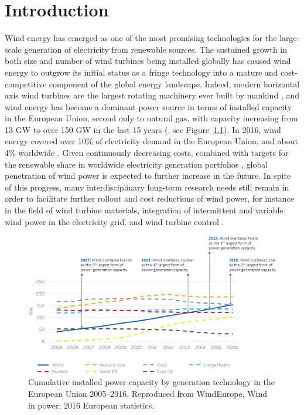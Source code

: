 \chapter{Introduction}\label{ch:introduction}

Wind energy has emerged as one of the most promising technologies for the large-scale generation of electricity from renewable sources. The sustained growth in both size and number of wind turbines being installed globally has caused wind energy to outgrow its initial status as a fringe technology into a mature and cost-competitive component of the global energy landscape. Indeed, modern horizontal axis wind turbines are the largest rotating machinery ever built by mankind \citep{van2016long}, and wind energy has become a dominant power source in terms of installed capacity in the European Union, second only to natural gas, with capacity increasing from 13 GW to over 150 GW in the last 15 years (\citealp{windeurope}, see Figure~\ref{fig:windeurope}). In 2016, wind energy covered over 10\% of electricity demand in the European Union, and about 4\% worldwide \citep{gwec2017}. Given continuously decreasing costs, combined with targets for the renewable share in worldwide electricity generation portfolios \citep{EC,ren21}, global penetration of wind power is expected to further increase in the future. In spite of this progress, many interdisciplinary long-term research needs still remain in order to facilitate further rollout and cost reductions of wind power, for instance in the field of wind turbine materials, integration of intermittent and variable wind power in the electricity grid, and wind turbine control \citep{wind2013long,van2016long}.

\begin{figure}
	\centering
	\includegraphics[width=\textwidth]{chapters/introduction/we3.eps}
	\caption{Cumulative installed power capacity by generation technology in the European Union 2005--2016. Reproduced from WindEurope, Wind in power: 2016 European statistics.  \label{fig:windeurope}}
\end{figure}

